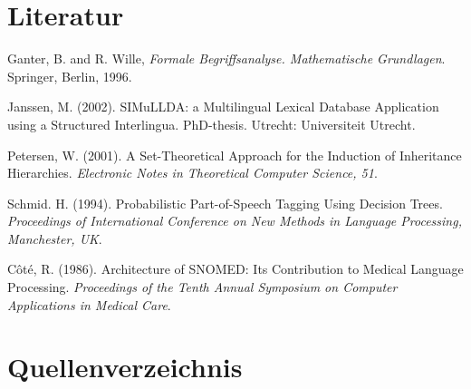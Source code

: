 \documentclass[pagesize,paper=A4,DIV=calc,fontsize=12pt,draft=false]{scrreprt}
\begin{document}
\section{Literatur}

Ganter, B. and R. Wille, \emph{Formale Begriffsanalyse. Mathematische Grundlagen}. Springer, Berlin, 1996.

Janssen, M. (2002). SIMuLLDA: a Multilingual Lexical Database Application using a Structured Interlingua. PhD-thesis. Utrecht: Universiteit Utrecht.

Petersen, W. (2001). A Set-Theoretical Approach for the Induction of Inheritance Hierarchies. \emph{Electronic Notes in Theoretical Computer Science, 51}.

Schmid. H. (1994). Probabilistic Part-of-Speech Tagging Using Decision Trees. \emph{Proceedings of International Conference on New Methods in Language Processing, Manchester, UK}.

Côté, R. (1986). Architecture of SNOMED: Its Contribution to Medical Language Processing. \emph{Proceedings of the Tenth Annual Symposium on Computer Applications in Medical Care}.

\section{Quellenverzeichnis}
\end{document}
